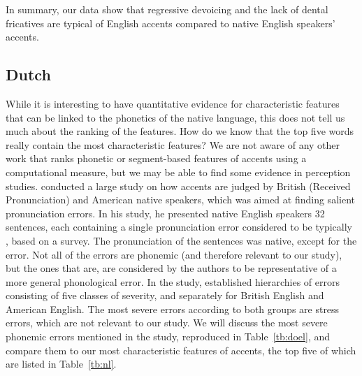 \documentclass[output=paper]{LSP/langsci}
\begin{document}
In summary, our data show that regressive devoicing and the lack of dental fricatives are typical of  English accents compared to native English speakers' accents.

\subsection{Dutch}


While it is interesting to have quantitative evidence for characteristic features that can be linked to the phonetics of the native language, this does not tell us much about the ranking of the features. How do we know that the top five words really contain the most characteristic features? We are not aware of any other work that ranks phonetic or segment-based features of accents using a computational measure, but we may be able to find some evidence in perception studies. \citet{van_den_doel_evaluation_2006} conducted a large study on how  accents are judged by British (Received Pronunciation) and American native speakers, which was aimed at finding salient pronunciation errors. In his study, he presented native English speakers 32 sentences, each containing a single pronunciation error considered to be typically , based on a survey. The pronunciation of the sentences was native, except for the error. Not all of the errors are phonemic (and therefore relevant to our study), but the ones that are, are considered by the authors to be representative of a more general phonological error. In the study, \citet[292]{van_den_doel_evaluation_2006} established hierarchies of errors consisting of five classes of severity, and separately for British English and American English. The most severe errors according to both groups are stress errors, which are not relevant to our study. We will discuss the most severe phonemic errors mentioned in the study, reproduced in Table~\ref{tb:doel}, and compare them to our most characteristic features of  accents, the top five of which are listed in Table~\ref{tb:nl}.
\end{document}
